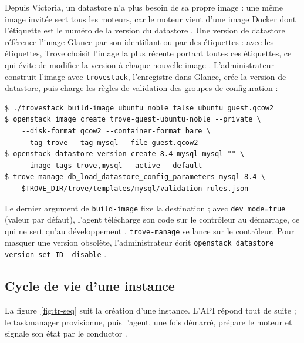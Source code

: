 Depuis Victoria, un datastore n'a plus besoin de sa propre image : une même image invitée sert tous les moteurs, car le moteur vient
d'une image Docker dont l'étiquette est le numéro de la version du datastore \parencite{trove-datastore,trove-guest-images}. Une version
de datastore référence l'image Glance par son identifiant ou par des étiquettes : avec les étiquettes, Trove choisit
l'image la plus récente portant toutes ces étiquettes, ce qui évite de modifier la version à chaque nouvelle image
\parencite{trove-datastore}. L'administrateur construit l'image avec \texttt{trovestack}, l'enregistre dans Glance, crée la
version de datastore, puis charge les règles de validation des groupes de configuration :

\par\noindent\begin{minipage}{\linewidth}
\begin{lstlisting}[style=terminal]
$ ./trovestack build-image ubuntu noble false ubuntu guest.qcow2
$ openstack image create trove-guest-ubuntu-noble --private \
    --disk-format qcow2 --container-format bare \
    --tag trove --tag mysql --file guest.qcow2
$ openstack datastore version create 8.4 mysql mysql "" \
    --image-tags trove,mysql --active --default
$ trove-manage db_load_datastore_config_parameters mysql 8.4 \
    $TROVE_DIR/trove/templates/mysql/validation-rules.json
\end{lstlisting}
\end{minipage}\par

Le dernier argument de \texttt{build-image} fixe la destination ; avec \texttt{dev\_mode=true} (valeur par défaut), l'agent télécharge
son code sur le contrôleur au démarrage, ce qui ne sert qu'au développement \parencite{trove-guest-images}. \texttt{trove-manage} se
lance sur le contrôleur. Pour masquer une version obsolète, l'administrateur écrit
\texttt{openstack datastore version set ID --disable} \parencite{trove-datastore}.

\subsection{Cycle de vie d'une instance}\label{sec:tr-cycle}

La figure~\ref{fig:tr-seq} suit la création d'une instance. L'API répond tout de suite ; le taskmanager provisionne, puis l'agent, une
fois démarré, prépare le moteur et signale son état par le conductor \parencite{trove-design,trove-create,trove-production}.

